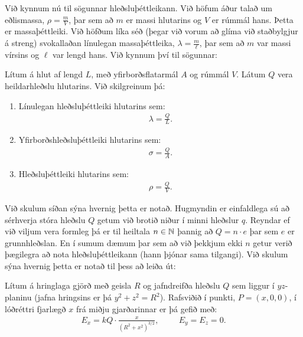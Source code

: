 \ifdefined \wholebook \else\documentclass[oneside]{book}\usepackage{EdlBook}\graphicspath{{figures/}}
\begin{document}
Við kynnum nú til sögunnar hleðsluþéttleikann. Við höfum áður talað um eðlismassa, $\rho = \frac{m}{V}$, þar sem að $m$ er massi hlutarins og $V$ er rúmmál hans. Þetta er massaþéttleiki. Við höfðum líka séð (þegar við vorum að glíma við staðbylgjur á streng) svokallaðan línulegan massaþéttleika, $\lambda = \frac{m}{\ell}$, þar sem að $m$ var massi vírsins og $\ell$ var lengd hans. Við kynnum því til sögunnar:


\begin{tcolorbox}
\begin{definition}
Lítum á hlut af lengd $L$, með yfirborðsflatarmál $A$ og rúmmál $V$. Látum $Q$ vera heildarhleðslu hlutarins. Við skilgreinum þá:
\begin{enumerate}[label = \textbf{(\roman*)}]
    \item Línulegan hleðsluþéttleiki hlutarins sem:
    \begin{align*}
        \lambda = \frac{Q}{L}.
    \end{align*}
    \item Yfirborðshleðsluþéttleiki hlutarins sem:
    \begin{align*}
        \sigma = \frac{Q}{A}.
    \end{align*}
    
    \item Hleðsluþéttleiki hlutarins sem:
    \begin{align*}
        \rho = \frac{Q}{V}.
    \end{align*}
\end{enumerate}
\end{definition}
\end{tcolorbox}

Við skulum síðan sýna hvernig þetta er notað. Hugmyndin er einfaldlega sú að sérhverja stóra hleðslu $Q$ getum við brotið niður í minni hleðslur $q$. Reyndar ef við viljum vera formleg þá er til heiltala $n \in \mathbb{N}$ þannig að $Q = n\cdot e$ þar sem $e$ er grunnhleðslan. En í sumum dæmum þar sem að við þekkjum ekki $n$ getur verið þægilegra að nota hleðsluþéttleikann (hann þjónar sama tilgangi). Við skulum sýna hvernig þetta er notað til þess að leiða út:

\begin{tcolorbox}
\begin{theorem}
Lítum á hringlaga gjörð með geisla $R$ og jafndreifða hleðslu $Q$ sem liggur í $yz$-planinu (jafna hringsins er þá $y^2 + z^2 = R^2$). Rafsviðið í punkti, $P = (x,0,0)$, í lóðréttri fjarlægð $x$ frá miðju gjarðarinnar er þá gefið með:
\begin{align*}
    E_x = kQ \cdot \frac{x}{(R^2 +x^2)^{3/2}}, \hspace{1cm} E_y = E_z = 0.
\end{align*}
\end{theorem}
\end{tcolorbox}
    
\end{document}
